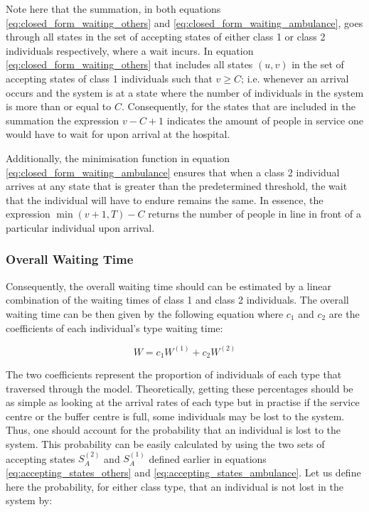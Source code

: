 Note here that the summation, in both equations \ref{eq:closed_form_waiting_others} 
and \ref{eq:closed_form_waiting_ambulance}, goes through all states in the set of 
accepting 
states of either class 1 or class 2 individuals respectively, where a wait 
incurs. 
In equation \ref{eq:closed_form_waiting_others} that includes all states \((u,v)\) 
in the set of accepting states of class 1 individuals such that \( v \geq C\); i.e. 
whenever an arrival occurs and the system is at a state where the number of individuals 
in the system is more than or equal to $C$. 
Consequently, for the states that are included in the summation the expression 
\( v-C+1 \) indicates the amount of people in service one would have to wait for 
upon arrival at the hospital.

Additionally, the minimisation function in equation 
\ref{eq:closed_form_waiting_ambulance} 
ensures that when a class 2 individual arrives at any state 
that is greater than the predetermined threshold, the wait that the individual will 
have to endure remains the same. 
In essence, the expression \(\min(v+1,T) - C\) returns the number of people in line 
in front of a particular individual upon arrival.


\subsubsection{Overall Waiting Time}

Consequently, the overall waiting time should can be estimated by a linear combination 
of the waiting times of class 1 and class 2 individuals. 
The overall waiting time can be then given by the following equation where \(c_1\) 
and \(c_2\) are the coefficients of each individual's type waiting time:

\begin{equation}\label{overall_waiting_time_coeff}
    W = c_1 W^{(1)} + c_2 W^{(2)}
\end{equation}

The two coefficients represent the proportion of individuals of each type that 
traversed through the model. 
Theoretically, getting these percentages should be as simple as looking at the arrival 
rates of each type but in practise if the service centre or the buffer centre 
is full, some individuals may be lost to the system. 
Thus, one should account for the probability that an individual is lost to the system. 
This probability can be easily calculated by using the two sets of accepting states 
\(S_A^{(2)}\) and \(S_A^{(1)}\) defined earlier in equations 
\ref{eq:accepting_states_others} 
and \ref{eq:accepting_states_ambulance}. 
Let us define here the probability, for either class type, that an individual 
is not lost in the system by:

